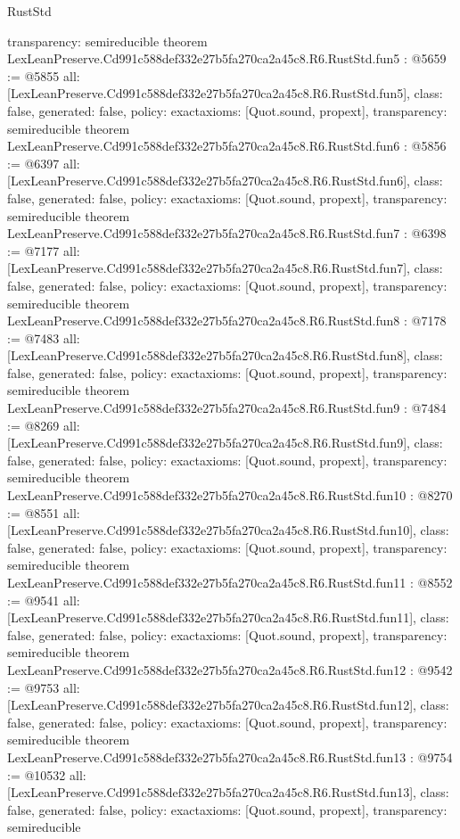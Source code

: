 \begin{lexlean}{RustStd}
\begin{coremodule}
{  transparency: semireducible
}
theorem LexLeanPreserve.Cd991c588def332e27b5fa270ca2a45c8.R6.RustStd.fun5 : @5659 := @5855 {
  all: [LexLeanPreserve.Cd991c588def332e27b5fa270ca2a45c8.R6.RustStd.fun5],
  class: false,
  generated: false,
  policy: exact{axioms: [Quot.sound, propext]},
  transparency: semireducible
}
theorem LexLeanPreserve.Cd991c588def332e27b5fa270ca2a45c8.R6.RustStd.fun6 : @5856 := @6397 {
  all: [LexLeanPreserve.Cd991c588def332e27b5fa270ca2a45c8.R6.RustStd.fun6],
  class: false,
  generated: false,
  policy: exact{axioms: [Quot.sound, propext]},
  transparency: semireducible
}
theorem LexLeanPreserve.Cd991c588def332e27b5fa270ca2a45c8.R6.RustStd.fun7 : @6398 := @7177 {
  all: [LexLeanPreserve.Cd991c588def332e27b5fa270ca2a45c8.R6.RustStd.fun7],
  class: false,
  generated: false,
  policy: exact{axioms: [Quot.sound, propext]},
  transparency: semireducible
}
theorem LexLeanPreserve.Cd991c588def332e27b5fa270ca2a45c8.R6.RustStd.fun8 : @7178 := @7483 {
  all: [LexLeanPreserve.Cd991c588def332e27b5fa270ca2a45c8.R6.RustStd.fun8],
  class: false,
  generated: false,
  policy: exact{axioms: [Quot.sound, propext]},
  transparency: semireducible
}
theorem LexLeanPreserve.Cd991c588def332e27b5fa270ca2a45c8.R6.RustStd.fun9 : @7484 := @8269 {
  all: [LexLeanPreserve.Cd991c588def332e27b5fa270ca2a45c8.R6.RustStd.fun9],
  class: false,
  generated: false,
  policy: exact{axioms: [Quot.sound, propext]},
  transparency: semireducible
}
theorem LexLeanPreserve.Cd991c588def332e27b5fa270ca2a45c8.R6.RustStd.fun10 : @8270 := @8551 {
  all: [LexLeanPreserve.Cd991c588def332e27b5fa270ca2a45c8.R6.RustStd.fun10],
  class: false,
  generated: false,
  policy: exact{axioms: [Quot.sound, propext]},
  transparency: semireducible
}
theorem LexLeanPreserve.Cd991c588def332e27b5fa270ca2a45c8.R6.RustStd.fun11 : @8552 := @9541 {
  all: [LexLeanPreserve.Cd991c588def332e27b5fa270ca2a45c8.R6.RustStd.fun11],
  class: false,
  generated: false,
  policy: exact{axioms: [Quot.sound, propext]},
  transparency: semireducible
}
theorem LexLeanPreserve.Cd991c588def332e27b5fa270ca2a45c8.R6.RustStd.fun12 : @9542 := @9753 {
  all: [LexLeanPreserve.Cd991c588def332e27b5fa270ca2a45c8.R6.RustStd.fun12],
  class: false,
  generated: false,
  policy: exact{axioms: [Quot.sound, propext]},
  transparency: semireducible
}
theorem LexLeanPreserve.Cd991c588def332e27b5fa270ca2a45c8.R6.RustStd.fun13 : @9754 := @10532 {
  all: [LexLeanPreserve.Cd991c588def332e27b5fa270ca2a45c8.R6.RustStd.fun13],
  class: false,
  generated: false,
  policy: exact{axioms: [Quot.sound, propext]},
  transparency: semireducible
}
\end{coremodule}
\end{lexlean}
